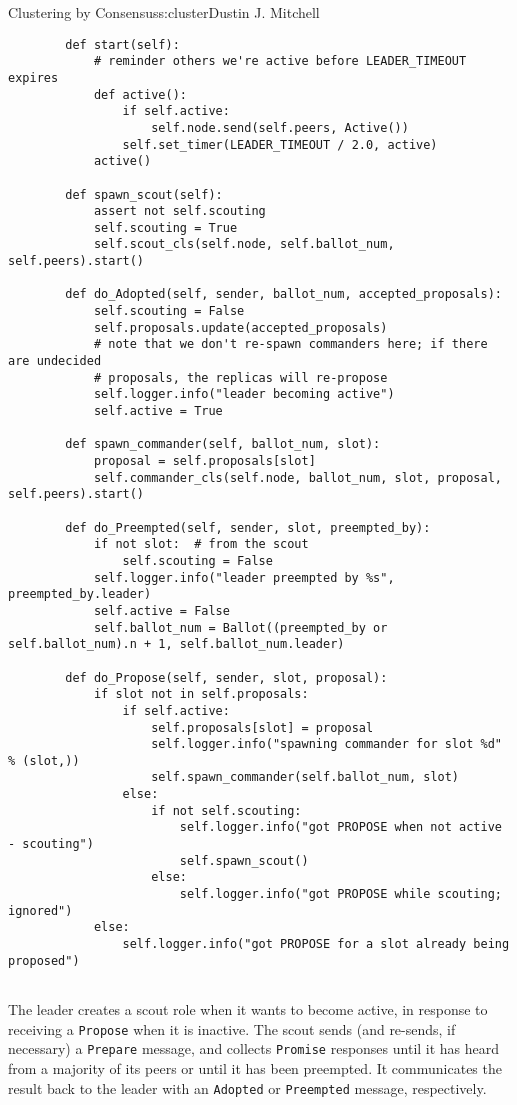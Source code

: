 \begin{aosachapter}{Clustering by Consensus}{s:cluster}{Dustin J. Mitchell}
\begin{verbatim}
        def start(self):
            # reminder others we're active before LEADER_TIMEOUT expires
            def active():
                if self.active:
                    self.node.send(self.peers, Active())
                self.set_timer(LEADER_TIMEOUT / 2.0, active)
            active()
    
        def spawn_scout(self):
            assert not self.scouting
            self.scouting = True
            self.scout_cls(self.node, self.ballot_num, self.peers).start()
    
        def do_Adopted(self, sender, ballot_num, accepted_proposals):
            self.scouting = False
            self.proposals.update(accepted_proposals)
            # note that we don't re-spawn commanders here; if there are undecided
            # proposals, the replicas will re-propose
            self.logger.info("leader becoming active")
            self.active = True
    
        def spawn_commander(self, ballot_num, slot):
            proposal = self.proposals[slot]
            self.commander_cls(self.node, ballot_num, slot, proposal, self.peers).start()
    
        def do_Preempted(self, sender, slot, preempted_by):
            if not slot:  # from the scout
                self.scouting = False
            self.logger.info("leader preempted by %s", preempted_by.leader)
            self.active = False
            self.ballot_num = Ballot((preempted_by or self.ballot_num).n + 1, self.ballot_num.leader)
    
        def do_Propose(self, sender, slot, proposal):
            if slot not in self.proposals:
                if self.active:
                    self.proposals[slot] = proposal
                    self.logger.info("spawning commander for slot %d" % (slot,))
                    self.spawn_commander(self.ballot_num, slot)
                else:
                    if not self.scouting:
                        self.logger.info("got PROPOSE when not active - scouting")
                        self.spawn_scout()
                    else:
                        self.logger.info("got PROPOSE while scouting; ignored")
            else:
                self.logger.info("got PROPOSE for a slot already being proposed")
    
\end{verbatim}

The leader creates a scout role when it wants to become active, in
response to receiving a \texttt{Propose} when it is inactive. The scout
sends (and re-sends, if necessary) a \texttt{Prepare} message, and
collects \texttt{Promise} responses until it has heard from a majority
of its peers or until it has been preempted. It communicates the result
back to the leader with an \texttt{Adopted} or \texttt{Preempted}
message, respectively.


\end{aosachapter}
